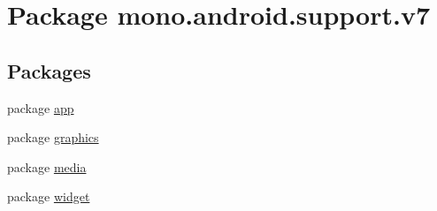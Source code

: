 \hypertarget{namespacemono_1_1android_1_1support_1_1v7}{
\section{Package mono.android.support.v7}
\label{namespacemono_1_1android_1_1support_1_1v7}
}
\subsection*{Packages}
\begin{CompactItemize}
\item 
package \hyperlink{namespacemono_1_1android_1_1support_1_1v7_1_1app}{app}
\item 
package \hyperlink{namespacemono_1_1android_1_1support_1_1v7_1_1graphics}{graphics}
\item 
package \hyperlink{namespacemono_1_1android_1_1support_1_1v7_1_1media}{media}
\item 
package \hyperlink{namespacemono_1_1android_1_1support_1_1v7_1_1widget}{widget}
\end{CompactItemize}
